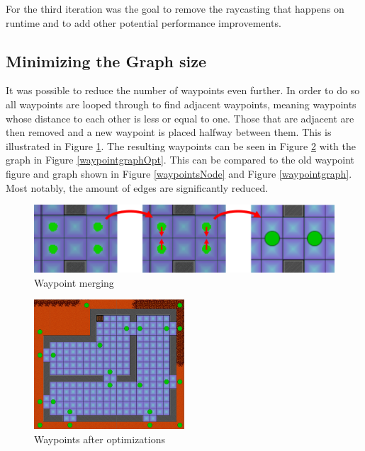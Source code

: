 For the third iteration was the goal to remove the raycasting that happens on runtime and to add other potential performance improvements.

\subsection*{Minimizing the Graph size}
It was possible to reduce the number of waypoints even further.
In order to do so all waypoints are looped through to find adjacent waypoints, meaning waypoints whose distance to each other is less or equal to one.
Those that are adjacent are then removed and a new waypoint is placed halfway between them.
This is illustrated in Figure \ref{waypointMerge}.
The resulting waypoints can be seen in Figure \ref{waypointOpt} with the graph in Figure \ref{waypointgraphOpt}. 
This can be compared to the old waypoint figure and graph shown in Figure \ref{waypointsNode} and Figure \ref{waypointgraph}.
Most notably, the amount of edges are significantly reduced.
\begin{figure}[H]
	\includegraphics[width=\textwidth]{figures/astar/waypointMerge}
	\caption{Waypoint merging}
	\label{waypointMerge}
\end{figure}

\begin{figure}[H]
\begin{center}

	\includegraphics[width=0.5\textwidth]{figures/astar/optimizedWaypoints}
	\caption{Waypoints after optimizations}
	\label{waypointOpt}
\end{center}
\end{figure}

